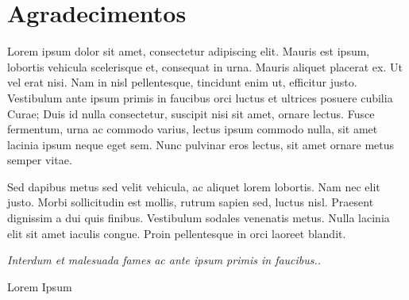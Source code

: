 \chapter*{Agradecimentos}

Lorem ipsum dolor sit amet, consectetur adipiscing elit. Mauris est ipsum, lobortis vehicula scelerisque et, consequat in urna. Mauris aliquet placerat ex. Ut vel erat nisi. Nam in nisl pellentesque, tincidunt enim ut, efficitur justo. Vestibulum ante ipsum primis in faucibus orci luctus et ultrices posuere cubilia Curae; Duis id nulla consectetur, suscipit nisi sit amet, ornare lectus. Fusce fermentum, urna ac commodo varius, lectus ipsum commodo nulla, sit amet lacinia ipsum neque eget sem. Nunc pulvinar eros lectus, sit amet ornare metus semper vitae.

Sed dapibus metus sed velit vehicula, ac aliquet lorem lobortis. Nam nec elit justo. Morbi sollicitudin est mollis, rutrum sapien sed, luctus nisl. Praesent dignissim a dui quis finibus. Vestibulum sodales venenatis metus. Nulla lacinia elit sit amet iaculis congue. Proin pellentesque in orci laoreet blandit.

\vfill

\hfill

\begin{flushright}

\small
\parbox{.6\textwidth}{\emph{Interdum et malesuada fames ac ante ipsum primis in faucibus..}}

Lorem Ipsum

\end{flushright}
